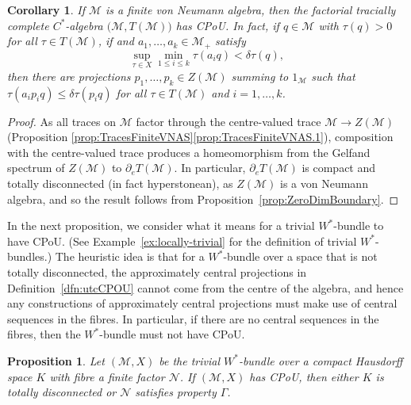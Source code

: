 \documentclass[a4paper,11pt]{amsart}
\newtheorem{proposition}[theorem]{Proposition}
\newtheorem{corollary}[theorem]{Corollary}
\theoremstyle{definition}
\numberwithin{equation}{section}
\numberwithin{theorem}{section}
\newcommand{\M}{\mathcal{M}}
\begin{document}
\begin{corollary}\label{cor:vNa-CPoU}
	If $\M$ is a finite von Neumann algebra,
	then the factorial tracially complete $C^*$-algebra $\big(\M, T(\M)\big)$ has CPoU.  In fact, if $q \in \M$ with $\tau(q) > 0$ for all $\tau \in T(\M)$, if and $a_1, \ldots, a_k \in \M_+$ satisfy
	\begin{equation}
		 \sup_{\tau \in X} \min_{1 \leq i \leq k} \tau(a_iq) < \delta \tau(q),
	\end{equation}
	then there are projections $p_1, \ldots, p_k \in Z(\M)$ summing to $1_\mathcal M$ such that $\tau(a_i p_iq) \leq \delta \tau(p_iq)$ for all $\tau \in T(\M)$ and $i = 1,\ldots, k$.
\end{corollary}
\begin{proof}	
As all traces on $\M$ factor through the centre-valued trace $\M \rightarrow Z(\M)$ (Proposition \ref{prop:TracesFiniteVNAS}\ref{prop:TracesFiniteVNAS.1}), composition with the centre-valued trace produces a homeomorphism from the Gelfand spectrum of $Z(\M)$ to $\partial_e T(\M)$.  
In particular, $\partial_e T(\M)$ is compact and totally disconnected (in fact hyperstonean), as $Z(\M)$ is a von Neumann algebra, and so the result follows from Proposition~\ref{prop:ZeroDimBoundary}.
\end{proof}


In the next proposition, we consider what it means for a trivial $W^*$-bundle to have CPoU. (See Example~\ref{ex:locally-trivial} for the definition of trivial $W^*$-bundles.)  
The heuristic idea is that for a $W^*$-bundle over a space that is not totally disconnected, the approximately central projections in Definition~\ref{dfn:utcCPOU} cannot come from the centre of the algebra, and hence any constructions of approximately central projections must make use of central sequences in the fibres.  In particular, if there are no central sequences in the fibres, then the $W^*$-bundle must not have CPoU.  

\begin{proposition}\label{prop:trivial-bundle-CPoU}
	Let $(\M, X)$ be the trivial $W^*$-bundle over a compact Hausdorff space $K$ with fibre a finite factor $\mathcal N$.  If $(\M, X)$ has CPoU, then either $K$ is totally disconnected or $\mathcal N$ satisfies property $\Gamma$.
\end{proposition}
\end{document}
